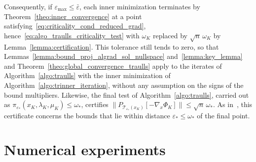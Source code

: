 \documentclass[pdflatex,sn-mathphys-num]{sn-jnl}%
\theoremstyle{thmstyleone}%
\newcommand{\calT}{{\mathcal{T}}}
\newcommand{\proj}[2]{P_{#1} \left[ {#2} \right]} %
\begin{document}
Consequently, if $\varepsilon_{\max} \le \bar\varepsilon$, each inner minimization terminates by Theorem~\ref{theo:inner_convergence} at a point satisfying~\eqref{eq:criticality_cond_reduced_grad}, hence~\eqref{eq:algo_traulls_criticality_test} with $\omega_K$ replaced by $\sqrt{n}\,\omega_K$ by Lemma~\ref{lemma:certification}. This tolerance still tends to zero, so that Lemmas~\ref{lemma:bound_proj_algrad_sol_nullspace} and~\ref{lemma:key_lemma} and Theorem~\ref{theo:global_convergence_traulls} apply to the iterates of Algorithm~\ref{algo:traulls} with the inner minimization of Algorithm~\ref{algo:trinner_iteration}, without any assumption on the signs of the bound multipliers. Likewise, the final test of Algorithm~\ref{algo:traulls}, carried out as $\pi_{\varepsilon_*}(x_K,\lambda_K,\mu_K) \le \omega_*$, certifies $\|\proj{\calT_{\varepsilon_*}(x_K)}{-\nabla_x\Phi_K}\| \le \sqrt{n}\,\omega_*$. As in~\cite{conn-etal:1996b}, this certificate concerns the bounds that lie within distance $\varepsilon_* \le \omega_*$ of the final point.

\section{Numerical experiments}\label{sec:numerical_experiments}
\end{document}
